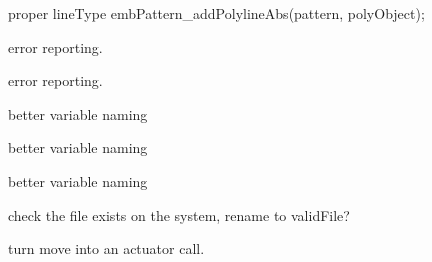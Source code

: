\begin{DoxyRefList}
\label{todo__todo000028}%
%


\label{todo__todo000029}%
%
proper line\+Type emb\+Pattern\+\_\+add\+Polyline\+Abs(pattern, poly\+Object);  
\item[Member \mbox{\hyperlink{interface_8cpp_a0eca4d9adccf7ea7711afaaa4bfb2843}{set\+\_\+enabled}} (QObject $\ast$parent, const char $\ast$key, bool enabled)]\label{todo__todo000012}%
%
error reporting.  
\item[Member \mbox{\hyperlink{interface_8cpp_adc2edf17601102cd3f68307eb8fb93d9}{set\+\_\+visibility}} (QObject $\ast$parent, const char $\ast$key, bool visibility)]\label{todo__todo000013}%
%
error reporting.  
\item[Member \mbox{\hyperlink{structSubDescriptor___affb2c75b7f632338f368aafab49f678d}{Sub\+Descriptor\+\_\+\+::color\+Code}} ]\label{todo__todo000218}%
%
better variable naming  
\item[Member \mbox{\hyperlink{structSubDescriptor___a0cfe04519ff6dab092ee7c002e55e520}{Sub\+Descriptor\+\_\+\+::some\+Int}} ]\label{todo__todo000216}%
%
better variable naming  
\item[Member \mbox{\hyperlink{structSubDescriptor___a6154b0f4ec7815c6d26c71852506418e}{Sub\+Descriptor\+\_\+\+::some\+Other\+Int}} ]\label{todo__todo000217}%
%
better variable naming  
\item[Member \mbox{\hyperlink{mainwindow_8cpp_a8e199e892707e7dbbe2e5b44513253c8}{valid\+File\+Format}} (String file\+Name)]\label{todo__todo000018}%
%
check the file exists on the system, rename to valid\+File?  
\item[Member \mbox{\hyperlink{classView_ae820c6a86f0a1908bf451f86db043489}{View\+::mouse\+Move\+Event}} (QMouse\+Event $\ast$event)]\label{todo__todo000212}%
%
turn move into an actuator call. 
\end{DoxyRefList}